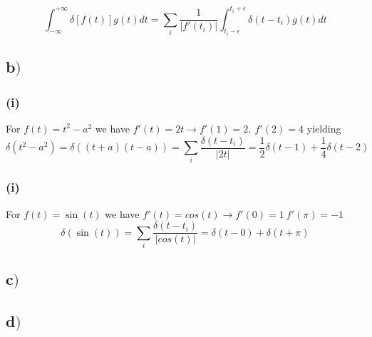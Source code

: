\documentclass{article}
\begin{document}
\begin{equation}
\int_{-\infty}^{+\infty} \delta[f(t)]g(t)dt = \sum_{i}\frac{1}{|f'(t_i)|} \int_{t_i-\epsilon}^{t_i + \epsilon} \delta(t-t_i)g(t)dt 
\end{equation}

\subsection*{b$)$}

\subsubsection*{(i)}
For $f(t) = t^2 -a^2$ we have $f'(t) = 2t \rightarrow f'(1) = 2, \ f'(2) = 4$ yielding
\begin{equation}
\delta(t^2 - a^2) = \delta((t+a)(t-a)) = \sum_{i} \frac{\delta(t-t_i)}{|2t|} = \frac{1}{2}\delta(t-1) + \frac{1}{4}\delta(t-2)
\end{equation}

\subsubsection*{(i)}
For $f(t) = \sin(t)$ we have $f'(t) = cos(t) \rightarrow f'(0) = 1 \ f'(\pi) = -1$
\begin{equation}
\delta(\sin{(t)}) = \sum_{i} \frac{\delta(t-t_i)}{|cos(t)|} = \delta(t-0) +\delta(t+\pi)
\end{equation}


\subsection*{c$)$}


\subsection*{d$)$}
\end{document}

